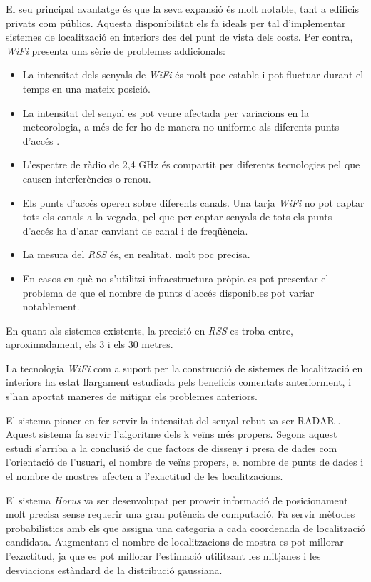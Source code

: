 El seu principal avantatge és que la seva expansió és molt notable, tant a edificis privats com públics. Aquesta disponibilitat els fa ideals per tal d'implementar sistemes de localització en interiors des del punt de vista dels costs. Per contra, \textit{WiFi} presenta una sèrie de problemes addicionals:

\begin{itemize}

    \item La intensitat dels senyals de \textit{WiFi} és molt poc estable i pot fluctuar durant el temps en una mateix posició.
    \item La intensitat del senyal es pot veure afectada per variacions en la meteorologia, a més de fer-ho de manera no uniforme als diferents punts d'accés \cite{crane}.
    \item L'espectre de ràdio de 2,4 GHz és compartit per diferents tecnologies pel que causen interferències o renou.
    \item Els punts d'accés operen sobre diferents canals. Una tarja \textit{WiFi} no pot captar tots els canals a la vegada, pel que per captar senyals de tots els punts d'accés ha d'anar canviant de canal i de freqüència.
    \item La mesura del \textit{RSS} és, en realitat, molt poc precisa.
    \item En casos en què no s’utilitzi infraestructura pròpia es pot presentar el problema de que el nombre de punts d'accés disponibles pot variar notablement.

\end{itemize}

En quant als sistemes existents, la precisió en \textit{RSS} es troba entre, aproximadament, els 3 i els 30 metres.

La tecnologia \textit{WiFi} com a suport per la construcció de sistemes de localització en interiors ha estat llargament estudiada pels beneficis comentats anteriorment, i s'han aportat maneres de mitigar els problemes anteriors.

El sistema pioner en fer servir la intensitat del senyal rebut va ser RADAR \cite{bahl}. Aquest sistema fa servir l'algoritme dels k veïns més propers. Segons aquest estudi s'arriba a la conclusió de que factors de disseny i presa de dades com l'orientació de l'usuari, el nombre de veïns propers, el nombre de punts de dades i el nombre de mostres afecten a l'exactitud de les localitzacions.

El sistema \textit{Horus} \cite{youssef} va ser desenvolupat per proveir informació de posicionament molt precisa sense requerir una gran potència de computació. Fa servir mètodes probabilístics amb els que assigna una categoria a cada coordenada de localització candidata. Augmentant el nombre de localitzacions de mostra es pot millorar l'exactitud, ja que es pot millorar l'estimació utilitzant les mitjanes i les desviacions estàndard de la distribució gaussiana.

